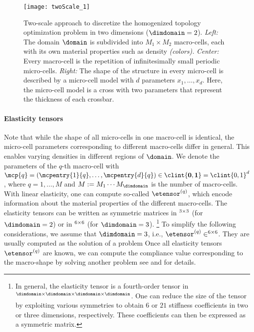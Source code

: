 \begin{figure}
  \texttt{[image: twoScale\_1]}%
  \caption[%
    Two-scale approach for topology optimization%
  ]{%
    Two-scale approach to discretize the homogenized topology
    optimization problem in two dimensions ($\dimdomain = 2$).
    \emph{Left:} The domain $\domain$ is subdivided into $M_1 \times M_2$
    macro-cells, each with its own material properties such as density
    \emph{(colors).}
    \emph{Center:} Every macro-cell is the repetition of infinitesimally small
    periodic micro-cells.
    \emph{Right:} The shape of the structure in every micro-cell is
    described by a micro-cell model with $d$ parameters $x_1, \dotsc, x_d$.
    Here, the micro-cell model is a cross with two parameters
    that represent the thickness of each crossbar.%
  }%
  \label{fig:twoScale}%
\end{figure}

\paragraph{Elasticity tensors}

Note that while the shape of all micro-cells in one macro-cell is identical,
the micro-cell parameters corresponding to different macro-cells differ
in general.
This enables varying densities in different regions of $\domain$.
We denote the parameters of the $q$-th macro-cell
with $\mcp{q} = (\mcpentry{1}{q}, \dotsc, \mcpentry{d}{q}) \in
\clint{\*0, \*1} = \clint{0, 1}^d$,
where $q = 1, \dotsc, M$ and
$M := M_1 \dotsm M_{\dimdomain}$ is the number of macro-cells.
With linear elasticity,
one can compute so-called  $\etensor^{(q)}$,
which encode information about the material properties
of the different macro-cells.
The elasticity tensors can be written as symmetric matrices
in $\real^{3 \times 3}$ (for $\dimdomain = 2$) or
in $\real^{6 \times 6}$ (for $\dimdomain = 3$).%
\footnote{%
  In general, the elasticity tensor is a fourth-order tensor in
  $\real^{\dimdomain \times \dimdomain \times \dimdomain \times \dimdomain}$.
  One can reduce the size of the tensor by exploiting various symmetries
  \cite{Huebner14Mehrdimensionale}
  to obtain $6$ or $21$ stiffness coefficients
  in two or three dimensions, respectively.
  These coefficients can then be expressed as a symmetric matrix.%
}
To simplify the following considerations,
we assume that $\dimdomain = 3$, i.e.,
$\etensor^{(q)} \in \real^{6 \times 6}$.
They are usually computed as the solution of a \fem problem
Once all elasticity tensors $\etensor^{(q)}$ are known,
we can compute the compliance value corresponding to the macro-shape
by solving another \fem problem 
see \cite{Allaire04Topology} and \cite{Huebner14Mehrdimensionale}
for details.

